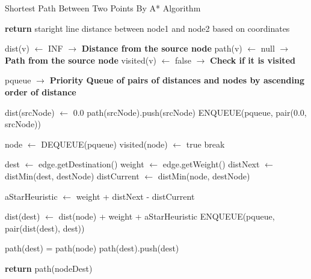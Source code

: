 \documentclass{article}
\begin{document}
\begin{algorithm}[h]
\caption{Shortest Path Between Two Points By A* Algorithm}
\begin{algorithmic}[1]

	\State \textbf{return} staright line distance between node1 and node2 based on coordinates
\EndProcedure

\State


	\State dist(v) $\gets$ INF $\to$ \textbf{Distance from the source node}
	\State path(v) $\gets$ null $\to$ \textbf{Path from the source node}
	\State visited(v) $\gets$ false $\to$ \textbf{Check if it is visited} 
\EndFor

\State pqueue $\to$ \textbf{Priority Queue of pairs of distances and nodes by ascending order of distance}

\State dist(srcNode) $\gets$ 0.0
\State path(srcNode).push(srcNode)
\State ENQUEUE(pqueue, pair(0.0, srcNode))

	\State node $\gets$ DEQUEUE(pqueue)
	\State visited(node) $\gets$ true
		\State break
	\EndIf

		\State dest $\gets$ edge.getDestination()
		\State weight $\gets$ edge.getWeight()
		\State distNext $\gets$ distMin(dest, destNode)
		\State distCurrent $\gets$ distMin(node, destNode)

		\State aStarHeuristic $\gets$ weight + distNext - distCurrent

			\State dist(dest) $\gets$ dist(node) + weight + aStarHeuristic
			\State ENQUEUE(pqueue, pair(dist(dest), dest))

			\State path(dest) = path(node)
			\State path(dest).push(dest)
		\EndIf
	\EndFor
\EndWhile

\State \textbf{return} path(nodeDest)
\EndProcedure

\end{algorithmic}
\end{algorithm}
\end{document}
